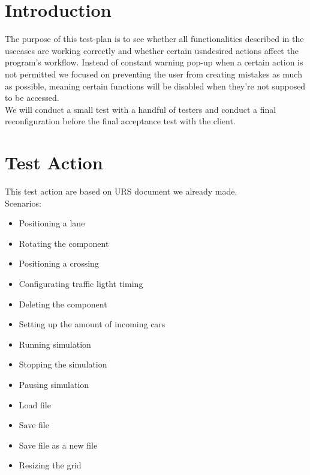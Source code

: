 \documentclass[a4paper,11pt]{article}
\title{\Title}
\author{}
\date{\today}
\begin{document}
\begin{titlepage}
\maketitle
\end{titlepage}
	\linespread{1.15}
	\tableofcontents
	\newpage
	\section{Introduction}
	The purpose of this test-plan is to see whether all functionalities described in the usecases are working correctly and whether certain usndesired actions affect the program's workflow. Instead of constant warning pop-up when a certain action is not permitted we focused on preventing the user from creating mistakes as much as possible, meaning certain functions will be disabled when they're not supposed to be accessed.\\
	We will conduct a small test with a handful of testers and conduct a final reconfiguration before the final acceptance test with the client.
	
	\section{Test Action}
	This test action are based on URS document we already made.\\
	
	Scenarios: 
	\begin{itemize}
		\item Positioning a lane
		\item Rotating the component
		\item Positioning a crossing
		\item Configurating traffic ligtht timing
		\item Deleting the component
		\item Setting up the amount of incoming cars 
		\item Running simulation
		\item Stopping the simulation
		\item Pausing simulation
		\item Load file
		\item Save file
		\item Save file as a new file
		\item Resizing the grid
	\end{itemize}
	
	\newpage
	
\end{document}
